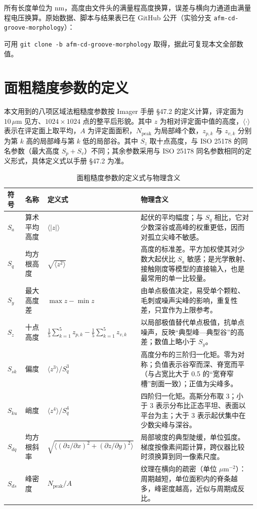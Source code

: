 \documentclass[12pt,a4paper,fontset=windows]{ctexart}
\begin{document}
所有长度单位为 nm，高度由文件头的满量程高度换算，误差与横向力通道由满量程电压换算。原始数据、脚本与结果表已在 GitHub 公开（实验分支 \texttt{afm-cd-groove-morphology}）：


可用 \texttt{git clone -b afm-cd-groove-morphology} 取得，据此可复现本文全部数值。


\newpage
\section{面粗糙度参数的定义}
\label{app:sparam}

本文用到的八项区域法粗糙度参数按 Imager 手册 §47.2 的定义计算，评定面为 $10\,\mu\mathrm{m}$ 见方、$1024\times1024$ 点的整平后形貌。其中 $z$ 为相对评定面中值的高度，$\langle\cdot\rangle$ 表示在评定面上取平均，$A$ 为评定面面积，$N_{\text{peak}}$ 为局部峰个数，$z_{p,k}$ 与 $z_{v,k}$ 分别为第 $k$ 高的局部峰与第 $k$ 低的局部谷。其中 $S_z$ 取十点高度，与 ISO 25178 的同名参数（最大高度 $S_p+S_v$）不同；其余参数采用与 ISO 25178 同名参数相同的定义形式，具体定义式以手册 §47.2 为准。

\begin{table}[H]
\centering
\caption{面粗糙度参数的定义式与物理含义}
\label{tab:sparam}
\small
{}
\begin{tabularx}{\textwidth}{@{}l l l X@{}}
\toprule
符号 & 名称 & 定义式 & 物理含义 \\
\midrule
$S_a$ & 算术平均高度 & $\langle\lvert z\rvert\rangle$ & 起伏的平均幅度；与 $S_q$ 相比，它对少数深谷或高峰的权重更低，因而对孤立尖峰不敏感。 \\
$S_q$ & 均方根高度 & $\sqrt{\langle z^2\rangle}$ & 高度的标准差。平方加权使其对少数大起伏比 $S_a$ 敏感；是光学散射、接触刚度等模型的直接输入，也是最常用的单一比较量。 \\
$S_y$ & 最大高度差 & $\max z-\min z$ & 由单点极值决定，易受单个颗粒、毛刺或噪声尖峰的影响，重复性差，只宜作为上限参考。 \\
$S_z$ & 十点高度 & $\frac{1}{5}\sum\limits_{k=1}^{5}z_{p,k}-\frac{1}{5}\sum\limits_{k=1}^{5}z_{v,k}$ & 以局部极值替代单点极值，抗单点噪声，反映“典型峰—典型谷”的高差；数值上略小于 $S_y$。 \\
$S_{sk}$ & 偏度 & $\langle z^3\rangle/S_q^3$ & 高度分布的三阶归一化矩。零为对称；负值表示谷窄而深、脊宽而平（与占宽比大于 0.5 的“宽脊窄槽”剖面一致）；正值为尖峰多。 \\
$S_{ku}$ & 峭度 & $\langle z^4\rangle/S_q^4$ & 四阶归一化矩。高斯分布取 3；小于 3 表示分布比正态平坦、表面以平台为主；大于 3 表示起伏集中在少数尖峰与深谷。 \\
$S_{dq}$ & 均方根斜率 & $\sqrt{\big\langle(\partial z/\partial x)^2+(\partial z/\partial y)^2\big\rangle}$ & 局部坡度的典型陡缓，单位弧度。梯度按像素间距计算，跨仪器比较时须换算到同一像素尺度。 \\
$S_{ds}$ & 峰密度 & $N_{\text{peak}}/A$ & 纹理在横向的疏密（单位 $\mu\mathrm{m}^{-2}$）：周期越短，单位面积内的脊条越多，峰密度越高，近似与周期成反比。 \\
\bottomrule
\end{tabularx}
\end{table}
\end{document}
